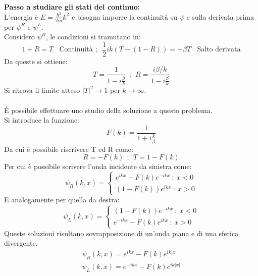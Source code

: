 \documentclass[twoside]{article}
\begin{document}
\noindent
\textbf{Passo a studiare gli stati del continuo:}
\\
L'energia è $E=\frac{\hbar^2}{2m}k^2$ e bisogna imporre la continuità su $\psi$ e sulla derivata prima per $\psi^R$ e $\psi^L$.
\\
Considero $\psi^R$, le condizioni si tramutano in:
\begin{equation}
    1+R=T \ \ \ \  \text{Continuità} \ \ ; \ \ \frac{1}{2}ik(T-(1-R))=-\beta T \ \ \ \ \text{Salto derivata}
\end{equation}
Da queste si ottiene:
\begin{equation}
    T=\frac{1}{1-i\frac{\beta}{k}} \ \ ; \ \ R=\frac{i\beta/k}{1-i\frac{\beta}{k}}
\end{equation}
Si ritrova il limite atteso $|T|^2 \rightarrow 1$ per $k \rightarrow \infty$.
\\
\\
\'E possibile effettuare uno studio della soluzione a questo problema.
\\
Si introduce la funzione:
\begin{equation}
    F(k)=\frac{1}{1+i\frac{k}{\beta}}
\end{equation}
Da cui è possibile riscrivere T ed R come:
\begin{equation}
    R=-F(k) \ \ ; \ \ T=1-F(k)
\end{equation}
Per cui è possibile scrivere l'onda incidente da sinistra come:
\begin{equation}
    \psi_R (k,x) = \left \{ \begin{array}{rl}
            e^{ikx}-F(k)e^{-ikx} \ : \ x < 0\\
         (1-F(k))e^{ikx} \ : \ x > 0
        \end{array}
    \right. 
\end{equation}
\noindent
E analogamente per quella da destra:
\begin{equation}
    \psi_L (k,x) = \left \{ \begin{array}{rl}
            (1-F(k))e^{-ikx} \ : \ x < 0\\
         e^{-ikx}-F(k)e^{ikx} \ : \ x > 0
        \end{array}
    \right. 
\end{equation}
Queste soluzioni risultano sovrapposizione di un'onda piana e di una sferica divergente. 
\begin{equation}
    \begin{split}
        \psi_R (k,x)=e^{ikx}-F(k)e^{ik|x|} \\
        \psi_L (k,x)=e^{-ikx}-F(k)e^{ik|x|}
    \end{split}
\end{equation}
\end{document}
